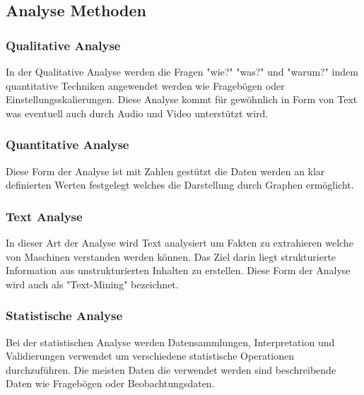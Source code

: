 		\subsection{Analyse Methoden}
		
			\subsubsection{Qualitative Analyse}
				In der Qualitative Analyse werden die Fragen "wie?" "was?" und "warum?" indem quantitative Techniken angewendet werden  wie Fragebögen oder Einstellungsskalierungen. Diese Analyse kommt für gewöhnlich in Form von Text was eventuell auch durch Audio und Video unterstützt wird. 
				
			\subsubsection{Quantitative Analyse}
				Diese Form der Analyse ist mit Zahlen gestützt die Daten werden an klar definierten Werten festgelegt welches die Darstellung durch Graphen ermöglicht. 
				
			\subsubsection{Text Analyse}
				In dieser Art der Analyse wird Text analysiert um Fakten zu extrahieren welche von Maschinen verstanden werden können. Das Ziel darin liegt strukturierte Information aus unstrukturierten Inhalten zu erstellen. Diese Form der Analyse wird auch als "Text-Mining" bezeichnet.
			
			\subsubsection{Statistische Analyse}
				Bei der statistischen Analyse werden Datensammlungen, Interpretation und Validierungen verwendet um verschiedene statistische Operationen durchzuführen. Die meisten Daten die verwendet werden sind beschreibende Daten wie Fragebögen oder Beobachtungsdaten. 
			
